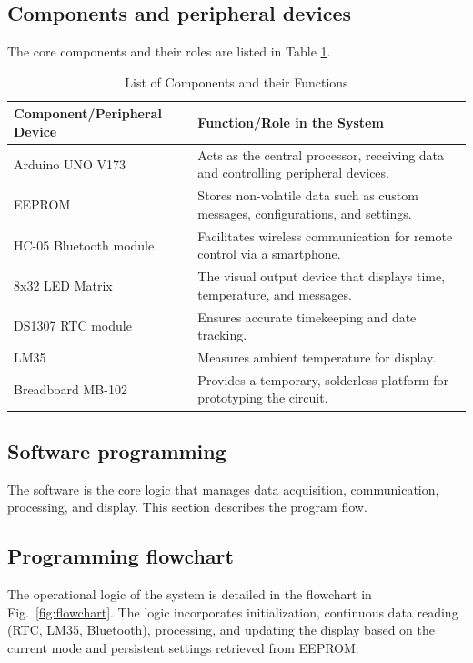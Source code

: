 \documentclass[a4paper, 10pt]{article}
\begin{document}
	\subsection{Components and peripheral devices}
	The core components and their roles are listed in Table \ref{tab:components}.
	\begin{table}[htbp]
		\centering
		\caption{List of Components and their Functions}
		\begin{tabular}{@{}ll@{}}
			\toprule
			\textbf{Component/Peripheral Device} & \textbf{Function/Role in the System} \\
			\midrule
			Arduino UNO V173 & Acts as the central processor, receiving data and controlling peripheral devices. \\
			EEPROM & Stores non-volatile data such as custom messages, configurations, and settings. \\
			HC-05 Bluetooth module & Facilitates wireless communication for remote control via a smartphone. \\
			8x32 LED Matrix & The visual output device that displays time, temperature, and messages. \\
			DS1307 RTC module & Ensures accurate timekeeping and date tracking. \\
			LM35 & Measures ambient temperature for display. \\
			Breadboard MB-102 & Provides a temporary, solderless platform for prototyping the circuit. \\
			\bottomrule
		\end{tabular}
		\label{tab:components}
	\end{table}
	
	\subsection{Software programming}
	The software is the core logic that manages data acquisition, communication, processing, and display. This section describes the program flow.
	
	\subsection{Programming flowchart}
	The operational logic of the system is detailed in the flowchart in Fig.~\ref{fig:flowchart}. The logic incorporates initialization, continuous data reading (RTC, LM35, Bluetooth), processing, and updating the display based on the current mode and persistent settings retrieved from EEPROM.
	
\end{document}
